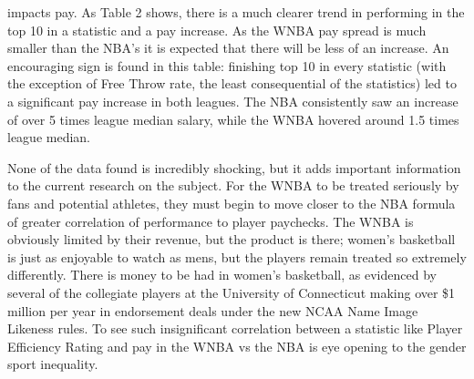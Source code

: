 \documentclass[12pt]{article}
\begin{document}
impacts pay. As Table 2 shows, there is a much clearer trend in performing in the top 10 in a statistic and a pay increase. 
As the WNBA pay spread is much smaller than the NBA’s it is expected that there will be less of an increase. An encouraging 
sign is found in this table: finishing top 10 in every statistic (with the exception of Free Throw rate, the least 
consequential of the statistics) led to a significant pay increase in both leagues. The NBA consistently saw an increase 
of over 5 times league median salary, while the WNBA hovered around 1.5 times league median.
\par
None of the data found is incredibly shocking, but it adds important information to the current research on the subject. 
For the WNBA to be treated seriously by fans and potential athletes, they must begin to move closer to the NBA formula 
of greater correlation of performance to player paychecks. The WNBA is obviously limited by their revenue, but the product 
is there; women’s basketball is just as enjoyable to watch as mens, but the players remain treated so extremely differently. 
There is money to be had in women’s basketball, as evidenced by several of the collegiate players at the University of 
Connecticut making over \$1 million per year in endorsement deals under the new NCAA Name Image Likeness rules. To see 
such insignificant correlation between a statistic like Player Efficiency Rating and pay in the WNBA vs the NBA is eye
 opening to the gender sport inequality.
\end{document}
